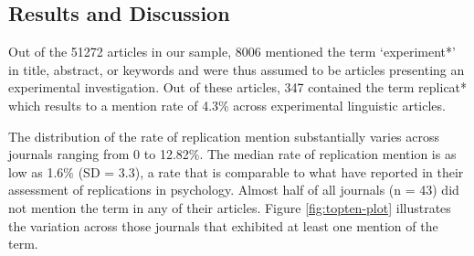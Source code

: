 \documentclass[cm,linguex]{glossa}
\begin{document}
\hypertarget{results-and-discussion}{%
\subsection{Results and Discussion}\label{results-and-discussion}}

Out of the 51272 articles in our sample, 8006 mentioned the term `experiment*' in title, abstract, or keywords and were thus assumed to be articles presenting an experimental investigation.
Out of these articles, 347 contained the term replicat* which results to a mention rate of 4.3\% across experimental linguistic articles.

The distribution of the rate of replication mention substantially varies across journals ranging from 0 to 12.82\%. The median rate of replication mention is as low as 1.6\% (SD = 3.3), a rate that is comparable to what \citet{makel_replications_2012} have reported in their assessment of replications in psychology.
Almost half of all journals (n = 43) did not mention the term in any of their articles.
Figure \ref{fig:topten-plot} illustrates the variation across those journals that exhibited at least one mention of the term.
\end{document}

